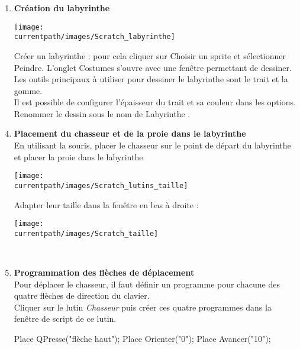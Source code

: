 \begin{changemargin}{-10mm}{-10mm}
\begin{enigme}
\begin{enumerate}
      \pagebreak

      \item {\bf Création du labyrinthe} \dotfill \\ 
         \begin{minipage}{9cm}
            \texttt{[image: \\currentpath/images/Scratch\_labyrinthe]}
         \end{minipage}
         \qquad
         \begin{minipage}{6cm}
            Créer un labyrinthe : pour cela cliquer sur \textcolor{B1}{Choisir un sprite} et sélectionner \textcolor{B1}{Peindre}. L'onglet \textcolor{B1}{Costumes} s'ouvre avec une fenêtre permettant de dessiner. \\
            Les outils principaux à utiliser pour dessiner le labyrinthe sont le \textcolor{B1}{trait} et la \textcolor{B1}{gomme}. \\
            Il est possible de configurer l'épaisseur du trait et sa couleur dans les options. \\
            Renommer le dessin sous le nom de \og Labyrinthe \fg.
         \end{minipage}
   \end{enumerate}
 
   \begin{enumerate}
   \setcounter{enumi}{3}
      \item {\bf Placement du chasseur et de la proie dans le labyrinthe} \dotfill \\
      En utilisant la souris, placer le chasseur sur le point de départ du labyrinthe et placer la proie dans le labyrinthe\\
      \parbox{2.5cm}{\texttt{[image: \\currentpath/images/Scratch\_lutins\_taille]}} Adapter leur \textcolor{B1}{taille} dans la fenêtre en bas à droite : \parbox{3cm}{\texttt{[image: \\currentpath/images/Scratch\_taille]}} \\ \medskip

      \item {\bf Programmation des flèches de déplacement} \dotfill \\
      Pour déplacer le chasseur, il faut définir un programme pour chacune des quatre flèches de direction du clavier. \\
      Cliquer sur le lutin {\it Chasseur} puis créer ces quatre programmes dans la fenêtre de script de ce lutin. \\
      \begin{center}
      \begin{Scratch}[Echelle=0.75]
         Place QPresse("flèche haut");
         Place Orienter("0");
         Place Avancer("10");
      \end{Scratch}


\end{center}
\end{enumerate}
\end{enigme}
\end{changemargin}
